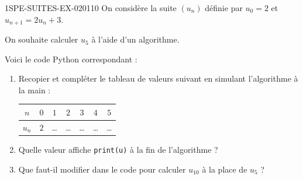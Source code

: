 \begin{exercice}{1SPE-SUITES-EX-020}{1}{10}
On considère la suite $(u_n)$ définie par $u_0 = 2$ et $u_{n+1} = 2u_n + 3$.

On souhaite calculer $u_5$ à l'aide d'un algorithme.

Voici le code Python correspondant :



\begin{enumerate}
  \item Recopier et compléter le tableau de valeurs suivant en simulant l'algorithme à la main :

  \medskip
  \begin{tabular}{|c|c|c|c|c|c|c|}
    \hline
    $n$ & $0$ & $1$ & $2$ & $3$ & $4$ & $5$ \\
    \hline
    $u_n$ & $2$ & \dots & \dots & \dots & \dots & \dots \\
    \hline
  \end{tabular}
  \medskip

  \item Quelle valeur affiche \texttt{print(u)} à la fin de l'algorithme ?
  \item Que faut-il modifier dans le code pour calculer $u_{10}$ à la place de $u_5$ ?
\end{enumerate}
\end{exercice}
